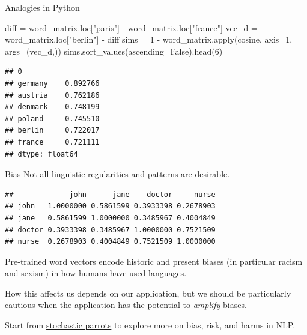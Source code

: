 \documentclass[
  10pt,
  ignorenonframetext,
  aspectratio=169]{beamer}
\newenvironment{Shaded}{\begin{snugshade}}{\end{snugshade}}
\newcommand{\BuiltInTok}[1]{\textcolor[rgb]{0.80,0.80,0.80}{#1}}
\newcommand{\DecValTok}[1]{\textcolor[rgb]{0.86,0.86,0.80}{#1}}
\newcommand{\NormalTok}[1]{\textcolor[rgb]{0.80,0.80,0.80}{#1}}
\newcommand{\OperatorTok}[1]{\textcolor[rgb]{0.94,0.94,0.82}{#1}}
\newcommand{\StringTok}[1]{\textcolor[rgb]{0.80,0.58,0.58}{#1}}
\newcommand{\VariableTok}[1]{\textcolor[rgb]{0.80,0.80,0.80}{#1}}
\begin{document}
\begin{frame}[fragile]{Analogies in Python}
\protect\hypertarget{analogies-in-python}{}
\scriptsize

\begin{Shaded}
\begin{Highlighting}[]

\NormalTok{diff }\OperatorTok{=}\NormalTok{ word\_matrix.loc[}\StringTok{"paris"}\NormalTok{] }\OperatorTok{{-}}\NormalTok{ word\_matrix.loc[}\StringTok{"france"}\NormalTok{] }
\NormalTok{vec\_d }\OperatorTok{=}\NormalTok{ word\_matrix.loc[}\StringTok{"berlin"}\NormalTok{] }\OperatorTok{{-}}\NormalTok{ diff}
\NormalTok{sims }\OperatorTok{=} \DecValTok{1} \OperatorTok{{-}}\NormalTok{ word\_matrix.}\BuiltInTok{apply}\NormalTok{(cosine, axis}\OperatorTok{=}\DecValTok{1}\NormalTok{, args}\OperatorTok{=}\NormalTok{(vec\_d,))}
\NormalTok{sims.sort\_values(ascending}\OperatorTok{=}\VariableTok{False}\NormalTok{).head(}\DecValTok{6}\NormalTok{)}
\end{Highlighting}
\end{Shaded}

\begin{verbatim}
## 0
## germany    0.892766
## austria    0.762186
## denmark    0.748199
## poland     0.745510
## berlin     0.722017
## france     0.721111
## dtype: float64
\end{verbatim}
\end{frame}

\begin{frame}[fragile]{Bias}
\protect\hypertarget{bias}{}
Not all linguistic regularities and patterns are desirable.

\begin{verbatim}
##             john      jane    doctor     nurse
## john   1.0000000 0.5861599 0.3933398 0.2678903
## jane   0.5861599 1.0000000 0.3485967 0.4004849
## doctor 0.3933398 0.3485967 1.0000000 0.7521509
## nurse  0.2678903 0.4004849 0.7521509 1.0000000
\end{verbatim}

Pre-trained word vectors encode historic and present biases (in
particular racism and sexism) in how humans have used languages.

How this affects us depends on our application, but we should be
particularly cautious when the application has the potential to
\emph{amplify} biases.

Start from
\href{https://dl.acm.org/doi/10.1145/3442188.3445922}{stochastic
parrots} to explore more on bias, risk, and harms in NLP.
\end{frame}
\end{document}
